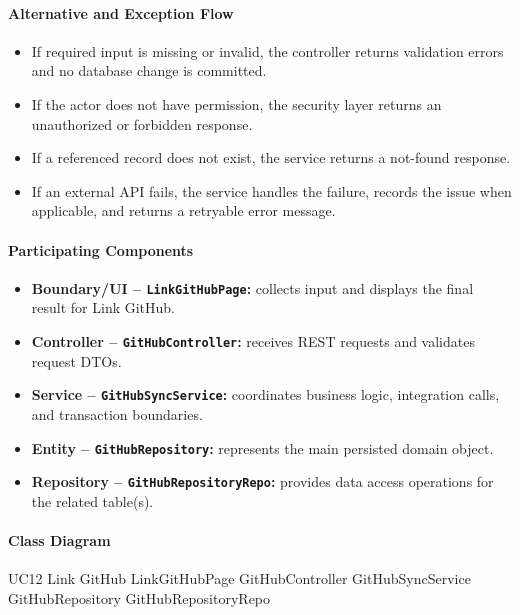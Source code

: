 \paragraph{Alternative and Exception Flow}

\begin{itemize}
    \item If required input is missing or invalid, the controller returns validation errors and no database change is committed.
    \item If the actor does not have permission, the security layer returns an unauthorized or forbidden response.
    \item If a referenced record does not exist, the service returns a not-found response.
    \item If an external API fails, the service handles the failure, records the issue when applicable, and returns a retryable error message.
\end{itemize}

\paragraph{Participating Components}

\begin{itemize}
    \item \textbf{Boundary/UI -- \texttt{LinkGitHubPage}:} collects input and displays the final result for Link GitHub.
    \item \textbf{Controller -- \texttt{GitHubController}:} receives REST requests and validates request DTOs.
    \item \textbf{Service -- \texttt{GitHubSyncService}:} coordinates business logic, integration calls, and transaction boundaries.
    \item \textbf{Entity -- \texttt{GitHubRepository}:} represents the main persisted domain object.
    \item \textbf{Repository -- \texttt{GitHubRepositoryRepo}:} provides data access operations for the related table(s).
\end{itemize}

\paragraph{Class Diagram}

\ClassDiagram
{UC12 Link GitHub}
{LinkGitHubPage}
{GitHubController}
{GitHubSyncService}
{GitHubRepository}
{GitHubRepositoryRepo}

